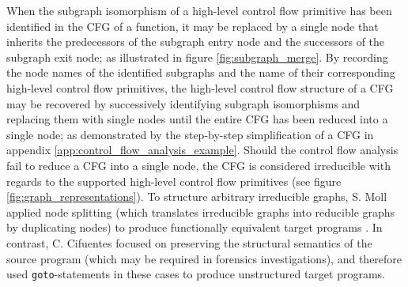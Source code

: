 When the subgraph isomorphism of a high-level control flow primitive has been identified in the CFG of a function, it may be replaced by a single node that inherits the predecessors of the subgraph entry node and the successors of the subgraph exit node; as illustrated in figure \ref{fig:subgraph_merge}. By recording the node names of the identified subgraphs and the name of their corresponding high-level control flow primitives, the high-level control flow structure of a CFG may be recovered by successively identifying subgraph isomorphisms and replacing them with single nodes until the entire CFG has been reduced into a single node; as demonstrated by the step-by-step simplification of a CFG in appendix \ref{app:control_flow_analysis_example}. Should the control flow analysis fail to reduce a CFG into a single node, the CFG is considered irreducible with regards to the supported high-level control flow primitives (see figure \ref{fig:graph_representations}). To structure arbitrary irreducible graphs, S. Moll applied node splitting (which translates irreducible graphs into reducible graphs by duplicating nodes) to produce functionally equivalent target programs \cite{decomp_of_llvm}. In contrast, C. Cifuentes focused on preserving the structural semantics of the source program (which may be required in forensics investigations), and therefore used \texttt{goto}-statements in these cases to produce unstructured target programs.

